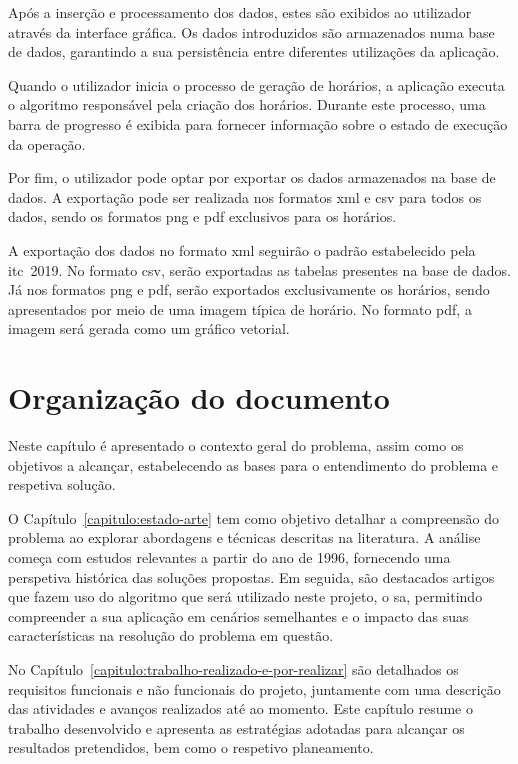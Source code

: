 Após a inserção e processamento dos dados, estes são exibidos ao utilizador através da interface gráfica. Os dados introduzidos são armazenados numa base de dados, garantindo a sua persistência entre diferentes utilizações da aplicação.

Quando o utilizador inicia o processo de geração de horários, a aplicação executa o algoritmo responsável pela criação dos horários. Durante este processo, uma barra de progresso é exibida para fornecer informação sobre o estado de execução da operação.


Por fim, o utilizador pode optar por exportar os dados armazenados na base de dados. A exportação pode ser realizada nos formatos \gls{xml} e \gls{csv} para todos os dados, sendo os formatos \gls{png} e \gls{pdf} exclusivos para os horários.

A exportação dos dados no formato \gls{xml} seguirão o padrão estabelecido pela \gls{itc}~2019. No formato \gls{csv}, serão exportadas as tabelas presentes na base de dados. Já nos formatos \gls{png} e \gls{pdf}, serão exportados exclusivamente os horários, sendo apresentados por meio de uma imagem típica de horário. No formato \gls{pdf}, a imagem será gerada como um gráfico vetorial.

\section{Organização do documento}

Neste capítulo é apresentado o contexto geral do problema, assim como os objetivos a alcançar, estabelecendo as bases para o entendimento do problema e respetiva solução.

O Capítulo~\ref{capitulo:estado-arte} tem como objetivo detalhar a compreensão do problema ao explorar abordagens e técnicas descritas na literatura. A análise começa com estudos relevantes a partir do ano de 1996, fornecendo uma perspetiva histórica das soluções propostas. Em seguida, são destacados artigos que fazem uso do algoritmo que será utilizado neste projeto, o \gls{sa}, permitindo compreender a sua aplicação em cenários semelhantes e o impacto das suas características na resolução do problema em questão.

No Capítulo~\ref{capitulo:trabalho-realizado-e-por-realizar} são detalhados os requisitos funcionais e não funcionais do projeto, juntamente com uma descrição das atividades e avanços realizados até ao momento. Este capítulo resume o trabalho desenvolvido e apresenta as estratégias adotadas para alcançar os resultados pretendidos, bem como o respetivo planeamento.